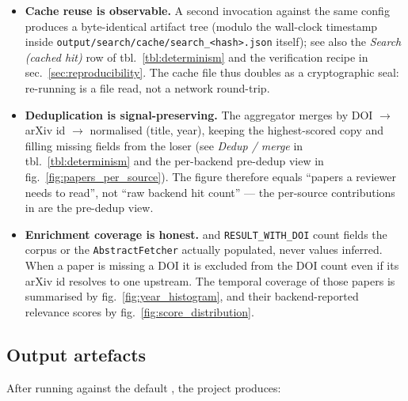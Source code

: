 \documentclass[
]{article}
\providecommand{\tightlist}{%
  \setlength{\itemsep}{0pt}\setlength{\parskip}{0pt}}
\begin{document}
\begin{itemize}
\tightlist
\item
  \textbf{Cache reuse is observable.} A second invocation against the
  same config produces a byte-identical artifact tree (modulo the
  wall-clock timestamp inside
  \texttt{output/search/cache/search\_\textless{}hash\textgreater{}.json}
  itself); see also the \emph{Search (cached hit)} row of
  tbl.~\ref{tbl:determinism} and the verification recipe in
  sec.~\ref{sec:reproducibility}. The cache file thus doubles as a
  cryptographic seal: re-running is a file read, not a network
  round-trip.
\item
  \textbf{Deduplication is signal-preserving.} The aggregator merges by
  DOI \texorpdfstring{\ensuremath{\to}}{->} arXiv id \texorpdfstring{\ensuremath{\to}}{->} normalised (title, year), keeping the highest-scored
  copy and filling missing fields from the loser (see \emph{Dedup /
  merge} in tbl.~\ref{tbl:determinism} and the per-backend pre-dedup
  view in fig.~\ref{fig:papers_per_source}). The
   figure therefore equals ``papers a
  reviewer needs to read'', not ``raw backend hit count'' --- the
  per-source contributions in  are the
  pre-dedup view.
\item
  \textbf{Enrichment coverage is honest.}
   and \texttt{RESULT\_WITH\_DOI} count
  fields the corpus or the \texttt{AbstractFetcher} actually populated,
  never values inferred. When a paper is missing a DOI it is excluded
  from the DOI count even if its arXiv id resolves to one upstream. The
  temporal coverage of those papers is summarised by
  fig.~\ref{fig:year_histogram}, and their backend-reported relevance
  scores by fig.~\ref{fig:score_distribution}.
\end{itemize}

\subsection{Output artefacts}\label{output-artefacts}

After running  against the
default , the project produces:
\end{document}
